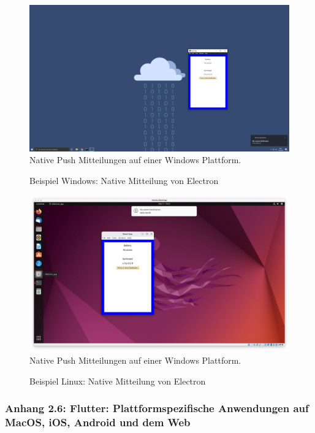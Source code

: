 \documentclass[a4paper]{scrartcl}
\begin{document}
\begin{figure}[H]
	\centering
	\caption{Beispiel Windows: Native Mitteilung von Electron}
	\includegraphics[scale=0.15]{_assets/Windows_electron.png} \\
	Native Push Mitteilungen auf einer Windows Plattform.
\end{figure}

\begin{figure}[H]
	\centering
	\caption{Beispiel Linux: Native Mitteilung von Electron}
	\includegraphics[scale=0.2]{_assets/Linux_Electron.png} \\
	Native Push Mitteilungen auf einer Windows Plattform.
\end{figure}

\newpage

\subsubsection*{Anhang 2.6: Flutter: Plattformspezifische Anwendungen auf MacOS, iOS, Android und dem Web}
\end{document}
